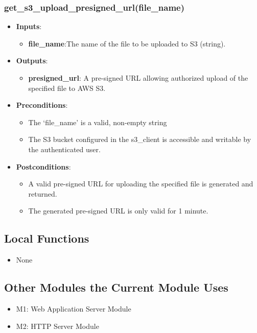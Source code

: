 \documentclass[12pt, titlepage]{article}
\begin{document}
\subsubsection{get\_s3\_upload\_presigned\_url(file\_name)}
\begin{itemize}
    \item \textbf{Inputs}:
        \begin{itemize}
            \item \textbf{file\_name}:The name of the file to be uploaded to S3 (string).
        \end{itemize}
        \item \textbf{Outputs}:
        \begin{itemize}
            \item \textbf{presigned\_url}: A pre-signed URL allowing authorized upload of the specified file to AWS S3.
        \end{itemize}
    \item \textbf{Preconditions}:
        \begin{itemize}
            \item The `file\_name' is a valid, non-empty string
            \item The S3 bucket configured in the s3\_client is accessible and writable by the authenticated user.
        \end{itemize}
    \item \textbf{Postconditions}:
        \begin{itemize}
            \item A valid pre-signed URL for uploading the specified file is generated and returned.
            \item The generated pre-signed URL is only valid for 1 minute.
        \end{itemize}
\end{itemize}


\subsection{Local Functions}
\begin{itemize}
    \item None
\end{itemize}
\label{Data Persistence Module}

\subsection{Other Modules the Current Module Uses}
\begin{itemize}
    \item M1: Web Application Server Module
    \item M2: HTTP Server Module
\end{itemize}
\end{document}
